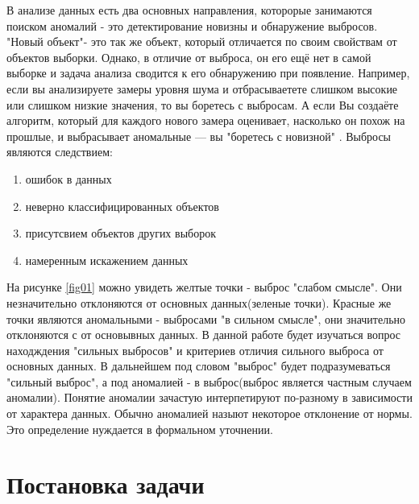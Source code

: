 В анализе данных есть два основных направления, которорые занимаются поиском аномалий - это детектирование новизны и обнаружение выбросов. "Новый объект"- это так же объект, который отличается по своим свойствам от объектов  выборки. Однако, в отличие от выброса, он его ещё нет в самой выборке и задача анализа сводится к его обнаружению при появление. Например, если вы анализируете замеры уровня шума и отбрасываетете слишком высокие или слишком низкие значения, то вы боретесь с выбросам. А если Вы создаёте алгоритм, который для каждого нового замера оценивает, насколько он похож на прошлые, и выбрасывает аномальные — вы "боретесь с новизной"
\cite{Book01}.
Выбросы являются следствием:
\begin{enumerate}
	\item ошибок в данных
	\item неверно классифицированных объектов
	\item присутсвием объектов других выборок
	\item намеренным искажением данных
\end{enumerate}


На рисунке \ref{fig01} можно увидеть желтые точки - выброс "слабом смысле". Они незначительно отклоняются от основных данных(зеленые точки). Красные же точки являются аномальными - выбросами "в сильном смысле", они значительно  отклоняются с от основывных данных. В данной работе будет изучаться вопрос находждения "сильных выбросов" и  критериев отличия сильного выброса от основных данных. В дальнейшем под словом "выброс" будет подразумеваться "сильный выброс",  а под  аномалией - в выброс(выброс является частным случаем аномалии).
Понятие аномалии зачастую интерпетируют по-разному в зависимости от характера данных. Обычно аномалией назыют некоторое отклонение от нормы. Это определение нуждается в формальном уточнении.

\section{Постановка задачи}



